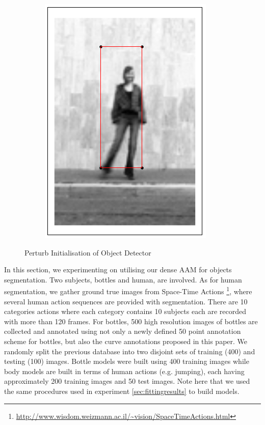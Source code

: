 \begin{figure}[!t]
\begin{subfigure}[b]{0.15\textwidth}
    \end{subfigure}
    \begin{subfigure}[b]{0.15\textwidth}
            \includegraphics[height=\textwidth]{supports/Segmentation_Measure/body}
    \end{subfigure}
    \caption{Perturb Initialisation of Object Detector}
    \label{fig:seg_init}
\end{figure}

In this section, we experimenting on utilising our dense AAM for objects segmentation. Two subjects, bottles and human, are involved. As for human segmentation, we gather ground true images from Space-Time Actions
\footnote{\label{sta} \url{http://www.wisdom.weizmann.ac.il/~vision/SpaceTimeActions.html}},
where several human action sequences are provided with segmentation. There are 10 categories actions where each category contains 10 subjects each are recorded with more than 120 frames. For bottles, 500 high resolution images of bottles are collected and annotated using not only a newly defined 50 point annotation scheme for bottles, but also the curve annotations proposed in this paper. We randomly split the previous database into two disjoint sets of training (400) and testing (100) images. Bottle models were built using 400 training images while body models are built in terms of human actions (e.g. jumping), each having approximately 200 training images and 50 test images. Note here that we used the same procedures used in experiment \ref{sec:fittingresults} to build models. 

